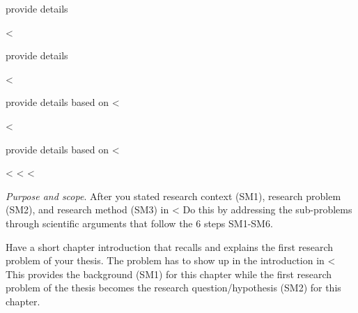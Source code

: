 {{{provide details

<%

provide details

<%

provide details based on <%

<%

provide details based on <%

<%
<%
<%

\emph{Purpose and scope}.
After you stated research context (SM1), research problem (SM2), and research method (SM3) in <%
Do this by addressing the sub-problems through scientific arguments that follow the 6 steps SM1-SM6.

Have a short chapter introduction that recalls and explains the first research problem of your thesis.
The problem has to show up in the introduction in <%
This provides the background (SM1) for this chapter while the first research problem of the thesis becomes the research question/hypothesis (SM2) for this chapter.

}}}
